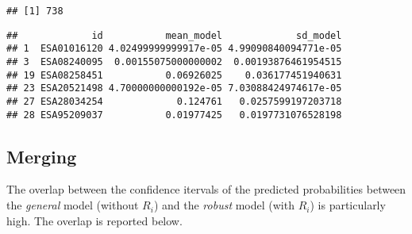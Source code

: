 \documentclass[]{article}
\newenvironment{Shaded}{\begin{snugshade}}{\end{snugshade}}
\newcommand{\KeywordTok}[1]{\textcolor[rgb]{0.13,0.29,0.53}{\textbf{#1}}}
\newcommand{\NormalTok}[1]{#1}
\newcommand{\OperatorTok}[1]{\textcolor[rgb]{0.81,0.36,0.00}{\textbf{#1}}}
\newcommand{\StringTok}[1]{\textcolor[rgb]{0.31,0.60,0.02}{#1}}
\begin{document}
\begin{verbatim}
## [1] 738
\end{verbatim}

\begin{Shaded}
\end{Shaded}

\begin{verbatim}
##             id           mean_model             sd_model
## 1  ESA01016120 4.02499999999917e-05 4.99090840094771e-05
## 3  ESA08240095  0.00155075000000002  0.00193876461954515
## 19 ESA08258451           0.06926025    0.036177451940631
## 23 ESA20521498 4.70000000000192e-05 7.03088424974617e-05
## 27 ESA28034254             0.124761   0.0257599197203718
## 28 ESA95209037           0.01977425   0.0197731076528198
\end{verbatim}

\hypertarget{merging}{%
\subsection{Merging}\label{merging}}

The overlap between the confidence itervals of the predicted
probabilities between the \textit{general} model (without \(R_i\)) and
the \textit{robust} model (with \(R_i\)) is particularly high. The
overlap is reported below.
\end{document}
